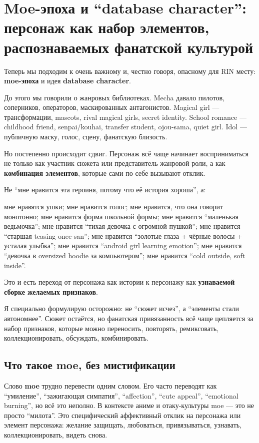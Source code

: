 \section{Moe-эпоха и “database character”: персонаж как набор элементов, распознаваемых фанатской культурой}

Теперь мы подходим к очень важному и, честно говоря, опасному для RIN
месту: \textbf{moe-эпоха} и идея \textbf{database character}.

До этого мы говорили о жанровых библиотеках. Mecha давало пилотов,
соперников, операторов, маскированных антагонистов. Magical girl ---
трансформации, mascots, rival magical girls, secret identity. School
romance --- childhood friend, senpai/\hspace{0pt}kouhai, transfer student,
ojou-sama, quiet girl. Idol --- публичную маску, голос, сцену, фанатскую
близость.

Но постепенно происходит сдвиг. Персонаж всё чаще начинает
восприниматься не только как участник сюжета или представитель жанровой
роли, а как \textbf{комбинация элементов}, которые сами по себе вызывают
отклик.

Не ``мне нравится эта героиня, потому что её история хороша'', а:

мне нравятся ушки; мне нравится голос; мне нравится, что она говорит
монотонно; мне нравится форма школьной формы; мне нравится ``маленькая
ведьмочка''; мне нравится ``тихая девочка с огромной пушкой''; мне
нравится ``старшая teasing onee-san''; мне нравится ``золотые глаза +
чёрные волосы + усталая улыбка''; мне нравится ``android girl learning
emotion''; мне нравится ``девочка в oversized hoodie за компьютером'';
мне нравится ``cold outside, soft inside''.

Это и есть переход от персонажа как истории к персонажу как
\textbf{узнаваемой сборке желаемых признаков}.

Я специально формулирую осторожно: не ``сюжет исчез'', а ``элементы
стали автономнее''. Сюжет остаётся, но фанатская привязанность всё чаще
цепляется за набор признаков, которые можно переносить, повторять,
ремиксовать, коллекционировать, обсуждать, комбинировать.

\subsection*{Что такое moe, без мистификации}

Слово \textbf{moe} трудно перевести одним словом. Его часто переводят
как ``умиление'', ``зажигающая симпатия'', ``affection'', ``cute
appeal'', ``emotional burning'', но всё это неполно. В контексте аниме и
отаку-культуры moe --- это не просто ``милота''. Это специфический
аффективный отклик на персонажа или элемент персонажа: желание защищать,
любоваться, привязываться, узнавать, коллекционировать, видеть снова.

